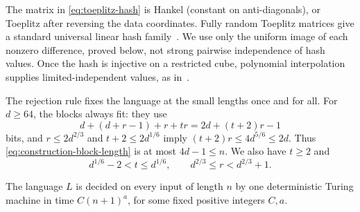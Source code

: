 The matrix in \eqref{eq:toeplitz-hash} is Hankel (constant on
anti-diagonals), or Toeplitz after reversing the data coordinates.
Fully random Toeplitz matrices give a standard universal linear hash
family~\cite[pp.~136--137]{Krawczyk94}.  We use only the uniform image
of each nonzero difference, proved below, not strong pairwise
independence of hash values.  Once the hash is injective on a restricted
cube, polynomial interpolation supplies limited-independent values,
as in~\cite[Section~6, proof of Proposition~6.3]{ABI86}.

The rejection rule fixes the language at the small lengths once and for
all.  For $d\ge64$, the blocks always fit: they use
\begin{equation}\label{eq:construction-block-length}
 d+(d+r-1)+r+tr=2d+(t+2)r-1
\end{equation}
bits, and $r\le2d^{2/3}$ and $t+2\le2d^{1/6}$ imply
$(t+2)r\le4d^{5/6}\le2d$.  Thus
\eqref{eq:construction-block-length} is at most $4d-1\le n$.
We also have $t\ge2$ and
\begin{equation}\label{eq:construction-growth}
 d^{1/6}-2<t\le d^{1/6},\qquad
 d^{2/3}\le r<d^{2/3}+1.
\end{equation}

\begin{proposition}\label{prop:polytime}
The language $L$ is decided on every input of length $n$ by one
deterministic Turing machine in time $C(n+1)^a$, for some fixed positive
integers $C,a$.
\end{proposition}

